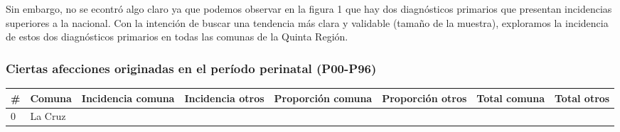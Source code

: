 \documentclass[]{article}
\begin{document}
Sin embargo, no se econtró algo claro ya que podemos observar en la figura 1 que hay dos diagnósticos
primarios que presentan incidencias superiores a la nacional. Con la
intención de buscar una tendencia más clara y validable (tamaño de la
muestra), exploramos la incidencia de estos dos diagnósticos primarios
en todas las comunas de la Quinta Región.

\hypertarget{ciertas-afecciones-originadas-en-el-peruxedodo-perinatal-p00-p96}{%
\subsubsection{Ciertas afecciones originadas en el período perinatal
(P00-P96)}\label{ciertas-afecciones-originadas-en-el-peruxedodo-perinatal-p00-p96}}

\begin{longtable}[]{@{}llllllll@{}}
\toprule
\begin{minipage}[b]{0.03\columnwidth}\raggedright
\#\strut
\end{minipage} & \begin{minipage}[b]{0.09\columnwidth}\raggedright
Comuna\strut
\end{minipage} & \begin{minipage}[b]{0.14\columnwidth}\raggedright
Incidencia comuna\strut
\end{minipage} & \begin{minipage}[b]{0.13\columnwidth}\raggedright
Incidencia otros\strut
\end{minipage} & \begin{minipage}[b]{0.10\columnwidth}\raggedright
Proporción comuna\strut
\end{minipage} & \begin{minipage}[b]{0.09\columnwidth}\raggedright
Proporción otros\strut
\end{minipage} & \begin{minipage}[b]{0.11\columnwidth}\raggedright
Total comuna\strut
\end{minipage} & \begin{minipage}[b]{0.10\columnwidth}\raggedright
Total otros\strut
\end{minipage}\tabularnewline
\midrule
\endhead
\begin{minipage}[t]{0.03\columnwidth}\raggedright
0\strut
\end{minipage} & \begin{minipage}[t]{0.09\columnwidth}\raggedright
La Cruz\strut
\end{minipage} & \begin{minipage}[t]{0.14\columnwidth}\raggedright

\end{minipage}
\end{longtable}
\end{document}

